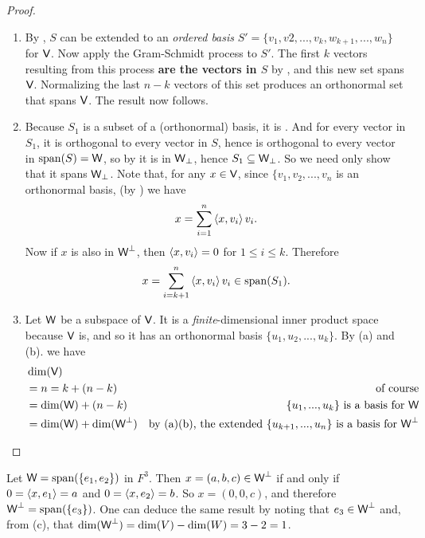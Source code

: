 \begin{proof} \ 

\begin{enumerate}
\item By , \(S\) can be extended to an \emph{ordered basis} \(S' = \{ v_1, v2, ..., v_{k}, w_{k+1}, ..., w_n \}\) for \(\textsf{V}\).
Now apply the Gram-Schmidt process to \(S'\).
The first \(k\) vectors resulting from this process \textbf{are the vectors in \(S\)} by , and this new set spans \(\textsf{V}\).
Normalizing the last \(n - k\) vectors of this set produces an orthonormal set that spans \(\textsf{V}\).
The result now follows.

\item Because \(S_1\) is a subset of a (orthonormal) basis, it is \LID{}.
And for every vector in \(S_1\), it is orthogonal to every vector in \(S\), hence is orthogonal to every vector in \(\operatorname{span}(S) = \textsf{W}\), so by  it is in \(\textsf{W}_{\perp}\), hence \(S_1 \subseteq \textsf{W}_{\perp}\).
So we need only show that it spans \(\textsf{W}_{\perp}\).
Note that, for any \(x \in \textsf{V}\), since \(\{ v_1, v_2, ..., v_n\) is an orthonormal basis, (by ) we have
\[
    x = \sum_{i = 1}^n \left< x, v_i \right> v_i.
\]
Now if \(x\) is also in \(\textsf{W}^{\perp}\), then \(\left< x, v_i \right> = 0\) for \(1 \le i \le k\).
Therefore
\[
    x = \sum_{i = k + 1}^n \left< x, v_i \right> v_i \in \operatorname{span}(S_1).
\]

\item Let \(\textsf{W}\) be a subspace of \(\textsf{V}\).
It is a \emph{finite}-dimensional inner product space because \(\textsf{V}\) is, and so it has an orthonormal basis \(\{ u_1, u_2, ..., u_k \}\).
By (a) and (b). we have
\begin{align*}
    & \dim(\textsf{V}) \\
    & = n = k + (n - k) & \text{of course} \\
    & = \dim(\textsf{W}) + (n - k) & \text{\(\{ u_1, ..., u_k \}\) is a basis for \(\textsf{W}\)} \\
    & = \dim(\textsf{W}) + \dim(\textsf{W}^{\perp}) & \text{by (a)(b), the extended \(\{ u_{k + 1}, ..., u_{n} \}\) is a basis for \(\textsf{W}^{\perp}\)}
\end{align*}
\end{enumerate}
\end{proof}

\begin{example} \label{example 6.2.11}
Let \(\textsf{W} = \operatorname{span}(\{ e_1, e_2 \})\) in \(F^3\).
Then \(x = (a, b, c) \in \textsf{W}^{\perp}\) if and only if \(0 = \left< x, e_1 \right> = a\) and \(0 = \left< x , e_2 \right> = b\).
So \(x = (0, 0, c)\), and therefore \(\textsf{W}^{\perp} = \operatorname{span}(\{ e_3 \})\).
One can deduce the same result by noting that \(e_3 \in \textsf{W}^{\perp}\) and, from (c), that \(\dim(\textsf{W}^{\perp}) = \dim(V) - \dim(W) = 3 - 2 = 1\).
\end{example}
